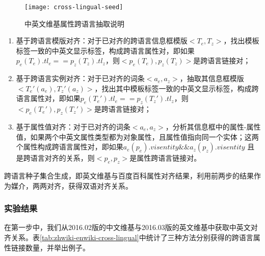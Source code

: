 \begin{figure}[h]
  \centering
    \texttt{[image: cross-lingual-seed]}
  \caption{中英文维基属性跨语言抽取说明}
  \label{fig:cross-lingual-seed}
\end{figure}

\begin{enumerate}[1)]
\item  {\heiti 基于跨语言模版对齐：}对于已对齐的跨语言信息框模版$<T_e, T_z>$，找出模板标签一致的中英文显示标签，构成跨语言属性对，即如果$p_e(T_e).tl_e == p_z(T_z).tl_z$，则$<p_e(T_e), p_z(T_z)>$是跨语言链接对；
\item  {\heiti 基于跨语言实例对齐：}对于已对齐的词条$<a_e, a_z>$，抽取其信息框模版$<T_e'(a_e), T_z'(a_z)>$，找出其中模板标签一致的中英文显示标签，构成跨语言属性对，即如果$p_e(T_e').tl_e == p_z(T_z').tl_z$，则$<p_e(T_e'), p_z(T_z')>$是跨语言链接对；
\item  {\heiti 基于属性值对齐：}对于已对齐的词条$<a_e, a_z>$，分析其信息框中的属性-属性值，如果两个中英文属性类型都为对象属性，且属性值指向同一个实体；这两个属性构成跨语言属性对，即如果$a_e(p_e).v is entity \&\& a_z(p_z).v is entity$ 且是跨语言对齐的关系，则$<p_e, p_z>$是属性跨语言链接对。
\end{enumerate}

{\heiti 跨语言种子集合生成}，即英文维基与百度百科属性对齐结果，利用前两步的结果作为媒介，两两对齐，获得双语对齐关系。

\subsubsection{实验结果}
在第一步中，我们从2016.02版的中文维基与2016.03版的英文维基中获取中英文对齐关系。表\ref{tab:zhwiki-enwiki-cross-lingual}中统计了三种方法分别获得的跨语言属性链接数量，并举出例子。

